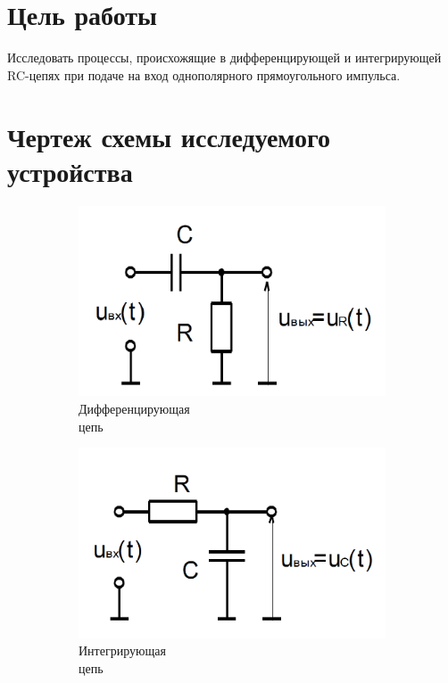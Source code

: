 





\section{Цель работы}

Исследовать процессы, происхожящие в дифференцирующей и интегрирующей RC-цепях при подаче на вход однополярного прямоугольного импульса.

\section{Чертеж схемы исследуемого устройства}

\begin{figure}[H]
\begin{center}
	\begin{subfigure}[b]{0.4\textwidth}
		\includegraphics[scale=0.3]{diff}
		\caption{Дифференцирующая\\ цепь}
	\end{subfigure}
	\begin{subfigure}[b]{0.4\textwidth}
		\includegraphics[scale=0.3]{int}
		\caption{Интегрирующая\\ цепь}
	\end{subfigure}
	\caption{}
\end{center}
\end{figure}

